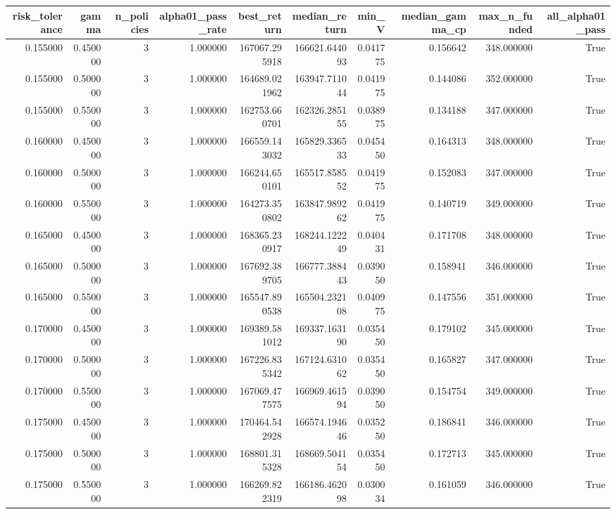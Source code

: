 \begin{tabular}{rrrrrrrrrr}
\toprule
risk\_tolerance & gamma & n\_policies & alpha01\_pass\_rate & best\_return & median\_return & min\_V & median\_gamma\_cp & max\_n\_funded & all\_alpha01\_pass \\
\midrule
0.155000 & 0.450000 & 3 & 1.000000 & 167067.295918 & 166621.644093 & 0.041775 & 0.156642 & 348.000000 & True \\
0.155000 & 0.500000 & 3 & 1.000000 & 164689.021962 & 163947.711044 & 0.041975 & 0.144086 & 352.000000 & True \\
0.155000 & 0.550000 & 3 & 1.000000 & 162753.660701 & 162326.285155 & 0.038975 & 0.134188 & 347.000000 & True \\
0.160000 & 0.450000 & 3 & 1.000000 & 166559.143032 & 165829.336533 & 0.045450 & 0.164313 & 348.000000 & True \\
0.160000 & 0.500000 & 3 & 1.000000 & 166244.650101 & 165517.858552 & 0.041975 & 0.152083 & 347.000000 & True \\
0.160000 & 0.550000 & 3 & 1.000000 & 164273.350802 & 163847.989262 & 0.041975 & 0.140719 & 349.000000 & True \\
0.165000 & 0.450000 & 3 & 1.000000 & 168365.230917 & 168244.122249 & 0.040431 & 0.171708 & 348.000000 & True \\
0.165000 & 0.500000 & 3 & 1.000000 & 167692.389705 & 166777.388443 & 0.039050 & 0.158941 & 346.000000 & True \\
0.165000 & 0.550000 & 3 & 1.000000 & 165547.890538 & 165504.232108 & 0.040975 & 0.147556 & 351.000000 & True \\
0.170000 & 0.450000 & 3 & 1.000000 & 169389.581012 & 169337.163190 & 0.035450 & 0.179102 & 345.000000 & True \\
0.170000 & 0.500000 & 3 & 1.000000 & 167226.835342 & 167124.631062 & 0.035450 & 0.165827 & 347.000000 & True \\
0.170000 & 0.550000 & 3 & 1.000000 & 167069.477575 & 166969.461594 & 0.039050 & 0.154754 & 349.000000 & True \\
0.175000 & 0.450000 & 3 & 1.000000 & 170464.542928 & 166574.194646 & 0.035250 & 0.186841 & 346.000000 & True \\
0.175000 & 0.500000 & 3 & 1.000000 & 168801.315328 & 168669.504154 & 0.035450 & 0.172713 & 345.000000 & True \\
0.175000 & 0.550000 & 3 & 1.000000 & 166269.822319 & 166186.462098 & 0.030034 & 0.161059 & 346.000000 & True \\
\bottomrule
\end{tabular}
